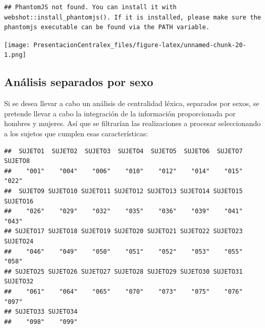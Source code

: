 \documentclass[
]{article}
\newenvironment{Shaded}{\begin{snugshade}}{\end{snugshade}}
\newcommand{\KeywordTok}[1]{\textcolor[rgb]{0.13,0.29,0.53}{\textbf{#1}}}
\newcommand{\NormalTok}[1]{#1}
\newcommand{\OperatorTok}[1]{\textcolor[rgb]{0.81,0.36,0.00}{\textbf{#1}}}
\newcommand{\StringTok}[1]{\textcolor[rgb]{0.31,0.60,0.02}{#1}}
\begin{document}
\begin{verbatim}
## PhantomJS not found. You can install it with webshot::install_phantomjs(). If it is installed, please make sure the phantomjs executable can be found via the PATH variable.
\end{verbatim}

\texttt{[image: PresentacionCentralex\_files/figure-latex/unnamed-chunk-20-1.png]}

\hypertarget{anuxe1lisis-separados-por-sexo}{%
\subsection{Análisis separados por
sexo}\label{anuxe1lisis-separados-por-sexo}}

Si se desea llevar a cabo un análisis de centralidad léxica, separados
por sexos, se pretende llevar a cabo la integración de la información
proporcionada por hombres y mujeres. Así que se filtrarían las
realizaciones a procesar seleccionando a los sujetos que cumplen esas
características:

\begin{Shaded}
\end{Shaded}

\begin{verbatim}
##  SUJETO1  SUJETO2  SUJETO3  SUJETO4  SUJETO5  SUJETO6  SUJETO7  SUJETO8 
##    "001"    "004"    "006"    "010"    "012"    "014"    "015"    "022" 
##  SUJETO9 SUJETO10 SUJETO11 SUJETO12 SUJETO13 SUJETO14 SUJETO15 SUJETO16 
##    "026"    "029"    "032"    "035"    "036"    "039"    "041"    "043" 
## SUJETO17 SUJETO18 SUJETO19 SUJETO20 SUJETO21 SUJETO22 SUJETO23 SUJETO24 
##    "046"    "049"    "050"    "051"    "052"    "053"    "055"    "058" 
## SUJETO25 SUJETO26 SUJETO27 SUJETO28 SUJETO29 SUJETO30 SUJETO31 SUJETO32 
##    "061"    "064"    "065"    "070"    "073"    "075"    "076"    "097" 
## SUJETO33 SUJETO34 
##    "098"    "099"
\end{verbatim}

\begin{Shaded}
\end{Shaded}
\end{document}
